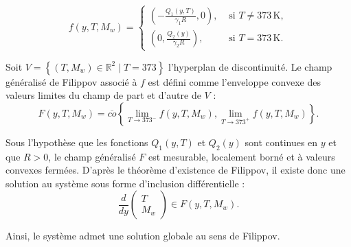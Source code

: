 \documentclass[12pt, oneside]{report} %
\newcommand{\R}{\mathbb{R}} %
\theoremstyle{definition}
\theoremstyle{remark}
\begin{document}
\begin{equation}
	f(y, T, M_w) = 
	\begin{cases}
		\left( -\frac{Q_1(y, T)}{\gamma_1 R}, 0 \right), & \text{ si } T \neq 373\,\mathrm{K}, \\
		\left( 0, \frac{Q_2(y)}{\gamma_2 R} \right), & \text{ si } T = 373\,\mathrm{K}.
	\end{cases}
\end{equation}

Soit $V = \left\{(T, M_w) \in \R^2 \mid T = 373 \right\}$ l’hyperplan de discontinuité. Le champ généralisé de Filippov associé à $f$ est défini comme l’enveloppe convexe des valeurs limites du champ de part et d’autre de $V$ :
\begin{equation}
	F(y, T, M_w) = \overline{co}\left\{ \lim_{T \to 373^-} f(y, T, M_w), \lim_{T \to 373^+} f(y, T, M_w) \right\}.
\end{equation}

Sous l’hypothèse que les fonctions $Q_1(y, T)$ et $Q_2(y)$ sont continues en $y$ et que $R > 0$, le champ généralisé $F$ est mesurable, localement borné et à valeurs convexes fermées. D’après le théorème d’existence de Filippov, il existe donc une solution au système sous forme d’inclusion différentielle :
\[
\frac{d}{dy} \begin{pmatrix} T \\ M_w \end{pmatrix} \in F(y, T, M_w).
\]

Ainsi, le système admet une solution globale au sens de Filippov.

%
\end{document}
